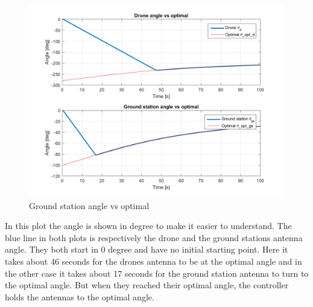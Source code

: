\begin{figure}[h]
	\centering
	\includegraphics[scale=0.6]{figures/gs_angle_vs_optimal.png}
	\caption{Ground station angle vs optimal}
	\label{fig:gs_angle_vs_optimal}
\end{figure}

In this plot the angle is shown in degree to make it easier to understand. The blue line in both plots is respectively the drone and the ground stations antenna angle. They both start in 0 degree and have no initial starting point. Here it takes about 46 seconds for the drones antenna to be at the optimal angle and in the other case it takes about 17 seconds for the ground station antenna to turn to the optimal angle. But when they reached their optimal angle, the controller holds the antennas to the optimal angle. 
\newpage
